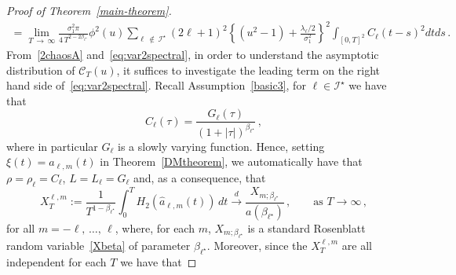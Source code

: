 \documentclass[AHL,Unicode,longabstracts,published]{cedram}
\newcommand{\clI}{\mathcal{I}}
\newcommand{\clC}{\mathcal{C}}
\begin{document}
\begin{proof}[Proof of Theorem~\ref{main-theorem}]
\begin{multline*}
=\lim_{T\,\to\,\infty}\frac{\sigma_{1}^{2}\pi }{4\,T^{2-2\beta_{\ell^\star}}}\phi ^{2}(u)\sum_{\ell\,\notin\,\clI^\star}(2\ell +1)^{2}\left\{\left(u^{2}-1\right)+\frac{\lambda_{\ell }/2}{\sigma_{1}^{2}}\right\} ^{2}\int_{[0,T]^{2}}C_{\ell }(t-s)^{2}dtds\,.
\end{multline*}
From~\eqref{2chaosA} and~\eqref{eq:var2spectral}, in order to understand the asymptotic distribution of $\clC_T(u)$, it suffices to investigate the leading term on the right hand side of~\eqref{eq:var2spectral}. Recall Assumption~\ref{basic3}, for $\ell\in \clI^\star$ we have that
\[
C_{\ell}(\tau)= \frac{G_\ell(\tau)}{(1+|\tau|)^{\beta_{\ell^\star}}} \,,
\]
where in particular $G_\ell$ is a slowly varying function. Hence, setting $\xi(t)=a_{\ell, m}(t)$ in Theorem~\ref{DMtheorem}, we automatically have that $\rho=\rho_\ell=C_{\ell}$, $L=L_\ell=G_\ell$ and, as a consequence, that
\begin{equation*}
X_T^{\ell, m}:=\frac{1}{T^{1-\beta_{\ell^\star}}}\int_0^T H_2(\widehat a_{\ell, m}(t))\, dt
\overset{d}{\longrightarrow} \frac{X_{m;\beta_{\ell^\star}}}{a\left(\beta_{\ell^\star}\right)}\,, \qquad \text{as } T \rightarrow
\infty\,,
\end{equation*}
for all $m=-\ell,\,\dots,\,\ell$, where, for each $m$, $X_{m;\beta_{\ell^\star}}$ is a standard Rosenblatt random variable~\eqref{Xbeta} of parameter $\beta_{\ell^\star}$. Moreover, since the $X_T^{\ell, m}$ are all independent for each $T$ we have that


\end{proof}
\end{document}
